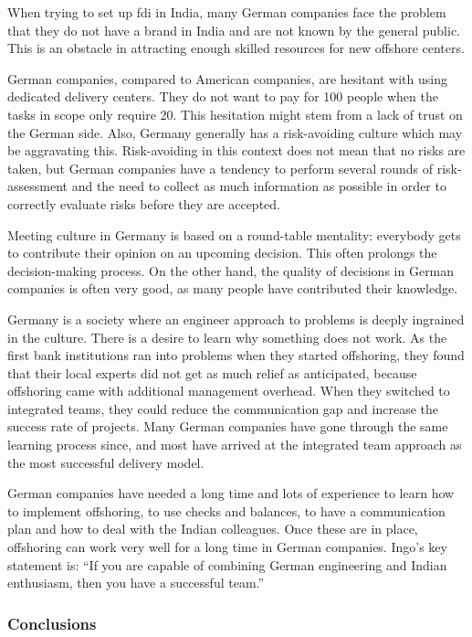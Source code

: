 When trying to set up \gls{fdi} in India, many German companies face the problem that they do not have a brand in India and are not known by the general public. This is an obstacle in attracting enough skilled resources for new offshore centers.

German companies, compared to American companies, are hesitant with using dedicated delivery centers. They do not want to pay for 100 people when the tasks in scope only require 20. This hesitation might stem from a lack of trust on the German side. Also, Germany generally has a risk-avoiding culture which may be aggravating this. Risk-avoiding in this context does not mean that no risks are taken, but German companies have a tendency to perform several rounds of risk-assessment and the need to collect as much information as possible in order to correctly evaluate risks before they are accepted.

Meeting culture in Germany is based on a round-table mentality: everybody gets to contribute their opinion on an upcoming decision. This often prolongs the decision-making process. On the other hand, the quality of decisions in German companies is often very good, as many people have contributed their knowledge.

Germany is a society where an engineer approach to problems is deeply ingrained in the culture. There is a desire to learn why something does not work. As the first bank institutions ran into problems when they started offshoring, they found that their local experts did not get as much relief as anticipated, because offshoring came with additional management overhead. When they switched to integrated teams, they could reduce the communication gap and increase the success rate of projects. Many German companies have gone through the same learning process since, and most have arrived at the integrated team approach as the most successful delivery model.

German companies have needed a long time and lots of experience to learn how to implement offshoring, to use checks and balances, to have a communication plan and how to deal with the Indian colleagues. Once these are in place, offshoring can work very well for a long time in German companies. Ingo's key statement is: ``If you are capable of combining German engineering and Indian enthusiasm, then you have a successful team.''

\subsubsection{Conclusions}

